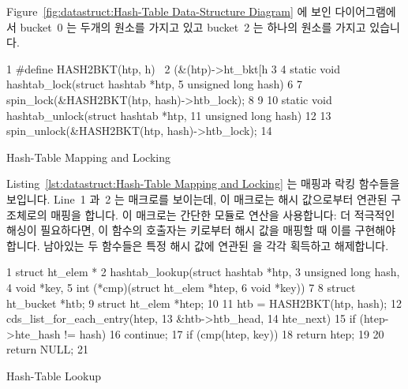 Figure~\ref{fig:datastruct:Hash-Table Data-Structure Diagram}
에 보인 다이어그램에서 bucket~0 는 두개의 원소를 가지고 있고 bucket~2 는 하나의
원소를 가지고 있습니다.

\begin{listing}[tb]
{ \scriptsize
\begin{verbbox}
 1 #define HASH2BKT(htp, h) \
 2   (&(htp)->ht_bkt[h %
 3 
 4 static void hashtab_lock(struct hashtab *htp,
 5                          unsigned long hash)
 6 {
 7   spin_lock(&HASH2BKT(htp, hash)->htb_lock);
 8 }
 9 
10 static void hashtab_unlock(struct hashtab *htp,
11                            unsigned long hash)
12 {
13   spin_unlock(&HASH2BKT(htp, hash)->htb_lock);
14 }
\end{verbbox}
}
\centering
\theverbbox
\caption{Hash-Table Mapping and Locking}
\label{lst:datastruct:Hash-Table Mapping and Locking}
\end{listing}

Listing~\ref{lst:datastruct:Hash-Table Mapping and Locking}
는 매핑과 락킹 함수들을 보입니다.
Line~1 과~2 는  매크로를 보이는데, 이 매크로는 해시 값으로부터
연관된  구조체로의 매핑을 합니다.
이 매크로는 간단한 모듈로 연산을 사용합니다: 더 적극적인 해싱이 필요하다면, 이
함수의 호출자는 키로부터 해시 값을 매핑할 때 이를 구현해야 합니다.
남아있는 두 함수들은 특정 해시 값에 연관된  을 각각 획득하고
해제합니다.

\begin{listing}[tb]
{ \scriptsize
\begin{verbbox}
 1 struct ht_elem *
 2 hashtab_lookup(struct hashtab *htp,
 3                unsigned long hash,
 4                void *key,
 5                int (*cmp)(struct ht_elem *htep,
 6                           void *key))
 7 {
 8   struct ht_bucket *htb;
 9   struct ht_elem *htep;
10 
11   htb = HASH2BKT(htp, hash);
12   cds_list_for_each_entry(htep,
13                           &htb->htb_head,
14                           hte_next) {
15     if (htep->hte_hash != hash)
16       continue;
17     if (cmp(htep, key))
18       return htep;
19   }
20   return NULL;
21 }
\end{verbbox}
}
\centering
\theverbbox
\caption{Hash-Table Lookup}
\label{lst:datastruct:Hash-Table Lookup}
\end{listing}

